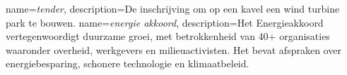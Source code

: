 \printglossaries
{}
{
    name=\textit{tender},
    description={De inschrijving om op een kavel een wind turbine park te bouwen.}
}
{
    name=\textit{energie akkoord},
    description={Het Energieakkoord vertegenwoordigt duurzame groei, met betrokkenheid van 40+ organisaties waaronder overheid, werkgevers en milieuactivisten. Het bevat afspraken over energiebesparing, schonere technologie en klimaatbeleid.}
}
